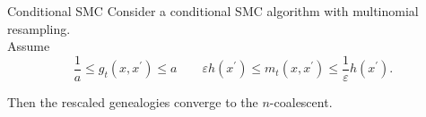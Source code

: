 \documentclass[aspectratio=169]{beamer}
\theoremstyle{definition}
\begin{document}
\begin{frame}{Conditional SMC}
Consider a conditional SMC algorithm with multinomial resampling.\\[10pt]
Assume
\begin{equation*}
\frac{1}{a} \leq g_t(x, x^\prime) \leq a \qquad
\varepsilon h(x^\prime) \leq m_t(x, x^\prime) \leq \frac{1}{\varepsilon} h(x^\prime) .
\end{equation*}

Then the rescaled genealogies converge to the $n$-coalescent.
\end{frame}
\end{document}
